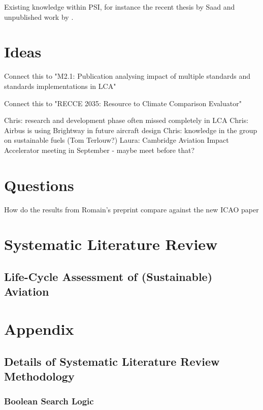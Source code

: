 \documentclass{article}
\begin{document}
    Existing knowledge within PSI, for instance the recent thesis by Saad \cite{saad_synthetic_2022} and unpublished work by \cite{sacchi_climate-neutral_2022}.

\section{Ideas}

    Connect this to "M2.1: Publication analysing impact of multiple standards and standards implementations in LCA"

    Connect this to "RECCE 2035: Resource to Climate Comparison Evaluator"

	Chris: research and development phase often missed completely in LCA
	Chris: Airbus is using Brightway in future aircraft design
	Chris: knowledge in the group on sustainable fuels (Tom Terlouw?)
	Laura: Cambridge Aviation Impact Accelerator meeting in September - maybe meet before that?

\section{Questions}

How do the results from Romain's preprint \cite{sacchi_climate-neutral_2022} compare against the new ICAO paper \cite{prussi_corsia_2021}

\newpage
\section{Systematic Literature Review}

    \subsection{Life-Cycle Assessment of (Sustainable) Aviation}
    
\section{Appendix}

    \subsection{Details of Systematic Literature Review Methodology}
    
        \subsubsection{Boolean Search Logic}
\end{document}
